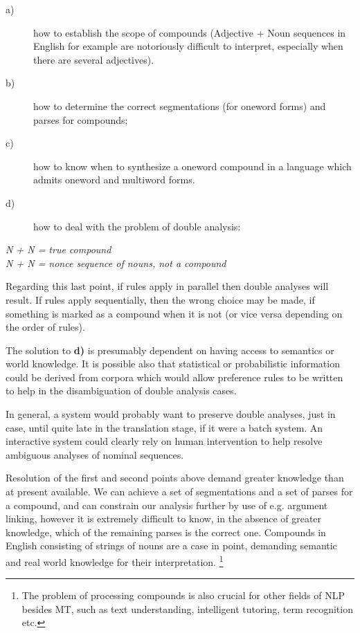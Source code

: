 \begin{description}
\item[a)]  how  to establish the scope of compounds (Adjective  +  Noun 
sequences in
English  for  example  are notoriously  difficult  to  interpret, 
especially when there are several adjectives).
\item[b)] how to determine the correct segmentations (for oneword forms)
and parses for compounds;
\item[c)]  how  to  know  when to synthesize a  oneword  compound  in  a 
language which admits oneword and multiword forms.
\item[d)] how to deal with the problem of double analysis:
\end{description}
\begin{center}
{\em                 N + N = true compound \\
                 N + N = nonce sequence of nouns, not a compound}
\end{center}

Regarding this last point, if  rules apply in parallel then double 
analyses will result.  If 
rules apply sequentially, then the wrong choice may be made, if something
is marked as a compound when it is not (or vice versa depending on the
order of rules).

The solution  to  {\bf d)}  is presumably  dependent  on  having access to
semantics or world knowledge. It is possible also that statistical or
probabilistic information could be derived from corpora which would allow
preference rules to be written to help in the disambiguation of
double analysis cases.
 
In  general,  a  system  would probably want to  preserve  double 
analyses, just in case, until quite late in the translation stage, if it
were a batch system. An interactive system could clearly rely on human
intervention to help resolve ambiguous analyses of nominal sequences.

Resolution  of the first and second points above  demand  greater 
knowledge  than  at present available.  We can achieve a  set  of 
segmentations  and  a  set  of parses for  a  compound,  and  can 
constrain our analysis further by use of e.g.  argument  linking, 
however  it  is extremely difficult to know,  in the  absence  of 
greater  knowledge,  which of the remaining parses is the correct 
one.  Compounds  in English consisting of strings of nouns are  a 
case  in point,  demanding semantic and real world knowledge  for 
their interpretation. 
\footnote{The problem of processing compounds is also crucial
for other fields of NLP besides MT, such as text understanding,
intelligent tutoring, term recognition etc.} 

